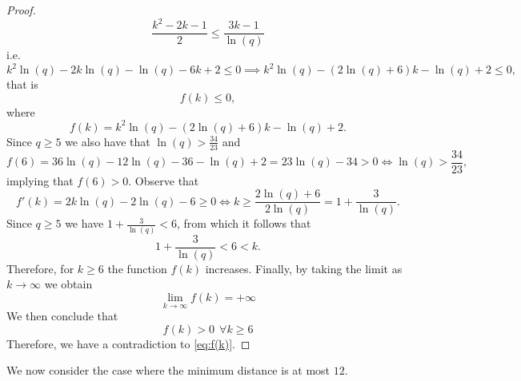 \documentclass[11pt]{amsart}
\theoremstyle{definition}
\begin{document}
\begin{proof}
\[
\frac{k^2-2k-1}{2}\leq \frac{3k-1}{\ln(q)}
\]
i.e.
\[
k^2\ln(q)-2k\ln(q)-\ln(q)-6k+2\leq0\implies k^2\ln(q)-(2\ln(q)+6)k-\ln(q)+2\leq0,
\]
that is
\begin{equation}\label{eq:f(k)}
f(k)\leq 0,
\end{equation}
where
	\[
f(k)=k^2\ln(q)-(2\ln(q)+6)k-\ln(q)+2.
\]
Since $q\geq 5$ we also have that $\ln(q)>\frac{34}{23}$ and
	\[
f(6)=36\ln(q)-12\ln(q)-36-\ln(q)+2=23\ln(q)-34>0\iff \ln(q)>\frac{34}{23},
\]
implying that $f(6)>0$.
Observe that
	\[
f'(k)=2k\ln(q)-2\ln(q)-6\geq0\iff k\geq\frac{2\ln(q)+6}{2\ln(q)}=1+\frac{3}{\ln(q)}.
\]
Since $q\geq 5$ we have $1+\frac{3}{\ln(q)}<6$, from which it follows that
\[
1+\frac{3}{\ln(q)}<6<k.
\]
Therefore, for $k\geq6$ the function $f(k)$ increases. Finally, by taking the limit as $k\to\infty$ we obtain
\[
\lim\limits_{k\to\infty}f(k)=+\infty
\]
We then conclude that
\[
f(k)>0 \ \ \forall k\geq 6
\]
Therefore, we have a contradiction to \eqref{eq:f(k)}.
\end{proof}

We now consider the case where the minimum distance is at most $12$.
\end{document}
